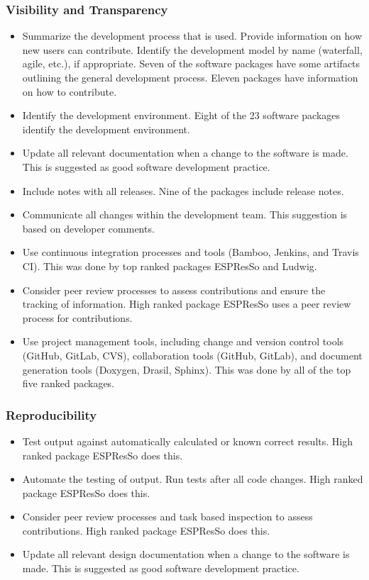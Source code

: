 \documentclass[final, 3p, times, authoryear]{elsarticle}
\begin{document}
\subsubsection{Visibility and Transparency}

\begin{itemize}
	\item Summarize the development process that is used. Provide information on how new users can contribute. Identify the development model by name (waterfall, agile, etc.), if appropriate.  Seven of the software packages have some artifacts outlining the general development process. Eleven packages have information on how to contribute. 
	\item Identify the development environment. Eight of the 23 software packages identify the development environment.
	\item Update all relevant documentation when a change to the software is made. This is suggested as good software development practice.
	\item Include notes with all releases. Nine of the packages include release notes.
	\item Communicate all changes within the development team. This suggestion is based on developer comments.
	\item Use continuous integration processes and tools (Bamboo, Jenkins, and Travis CI). This was done by top ranked packages ESPResSo and Ludwig.
	\item Consider peer review processes to assess contributions and ensure the tracking of information. High ranked package ESPResSo uses a peer review process for contributions. 
	\item Use project management tools, including change and version control tools (GitHub, GitLab, CVS), collaboration tools (GitHub, GitLab), and document generation tools (Doxygen, Drasil, Sphinx). This was done by all of the top five ranked packages. 
\end{itemize}

\subsubsection{Reproducibility}

\begin{itemize}
	\item Test output against automatically calculated or known correct results. High ranked package ESPResSo does this.
	\item Automate the testing of output. Run tests after all code changes. High ranked package ESPResSo does this.
	\item Consider peer review processes and task based inspection to assess contributions. High ranked package ESPResSo does this.
	\item Update all relevant design documentation when a change to the software is made. This is suggested as good software development practice.
\end{itemize}
\end{document}
